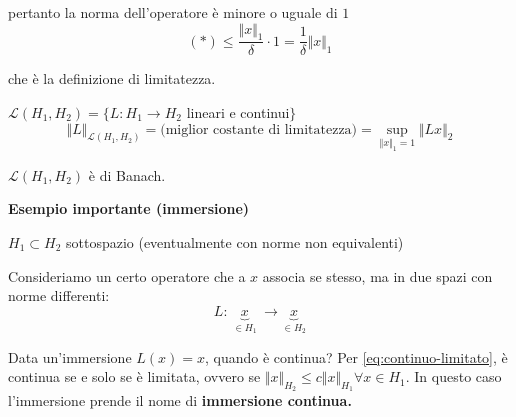 \documentclass[10pt,a4paper,twoside,openright]{book}
\begin{document}
\begin{dimostrazione}
\begin{itemize}
              pertanto la norma dell'operatore è minore o uguale di $1$
              \begin{equation*}
                  (*) \leqslant \frac{\Vert x\Vert _{1}}{\delta } \cdotp 1=\frac{1}{\delta }\Vert x\Vert _{1}
              \end{equation*}

              che è la definizione di limitatezza.
    \end{itemize}

\end{dimostrazione}
\begin{definition}
    $\mathcal{L}(H_{1},H_{2}) =\{L:H_{1}\rightarrow H_{2}$ lineari e continui$\}$
    \begin{equation*}
        \Vert L\Vert _{\mathcal{L}(H_{1},H_{2})} =\text{(miglior costante di limitatezza)} =\sup _{\Vert x\Vert _{1} =1}\Vert Lx\Vert _{2}
    \end{equation*}
\end{definition}
\begin{theorem}
    $\displaystyle \mathcal{L}(H_{1},H_{2})$ è di Banach.
\end{theorem}
\textbf{Esempio importante (immersione)}

$\displaystyle H_{1} \subset H_{2}$ sottospazio (eventualmente con norme non equivalenti)

Consideriamo un certo operatore che a $x$ associa se stesso, ma in due spazi con norme differenti:
\begin{equation*}
    L:\ \underbrace{x}_{\in H_{1}} \ \rightarrow \underbrace{x}_{\in H_{2}}
\end{equation*}

Data un'immersione $\displaystyle L(x) =x$, quando è continua? Per \eqref{eq:continuo-limitato}, è continua se e solo se è limitata, ovvero se $\displaystyle \Vert x\Vert _{H_{2}} \leqslant c\Vert x\Vert _{H_{1}} \forall x\in H_{1}$. In questo caso l'immersione prende il nome di \textbf{immersione continua.}
\end{document}
